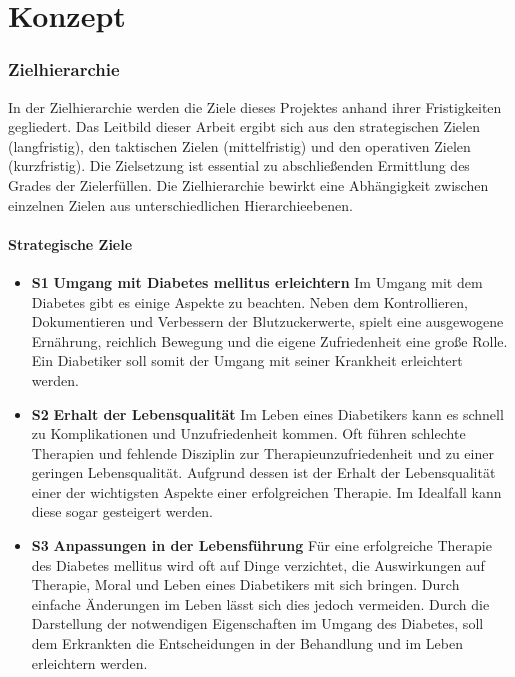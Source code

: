 \documentclass[a4paper,11pt]{article}%
\renewcommand{\\}{\vspace*{0.5\baselineskip} \newline}
\begin{document}
\newpage
\vspace*{\fill}
\part{Konzept}
\vfill
\newpage
\section{Zielhierarchie}
In der Zielhierarchie werden die Ziele dieses Projektes anhand ihrer Fristigkeiten gegliedert. Das Leitbild dieser Arbeit ergibt sich aus den strategischen Zielen (langfristig), den taktischen Zielen (mittelfristig) und den operativen Zielen (kurzfristig). Die Zielsetzung ist essential zu abschließenden Ermittlung des Grades der Zielerfüllen. Die Zielhierarchie bewirkt eine Abhängigkeit zwischen einzelnen Zielen aus unterschiedlichen Hierarchieebenen.
\subsection{Strategische Ziele}
\begin{itemize}
	\item \lbrack \textbf{S1}\rbrack  \textbf{ Umgang mit Diabetes mellitus erleichtern}\\
	Im Umgang mit dem Diabetes gibt es einige Aspekte zu beachten. Neben dem Kontrollieren, Dokumentieren und Verbessern der Blutzuckerwerte, spielt eine ausgewogene Ernährung, reichlich Bewegung und die eigene Zufriedenheit eine große Rolle. Ein Diabetiker soll somit der Umgang mit seiner Krankheit erleichtert werden.
	\item \lbrack \textbf{S2}\rbrack  \textbf{ Erhalt der Lebensqualität}\\
	Im Leben eines Diabetikers kann es schnell zu Komplikationen und Unzufriedenheit kommen. Oft führen schlechte Therapien und fehlende Disziplin zur Therapieunzufriedenheit und zu einer geringen Lebensqualität. Aufgrund dessen ist der Erhalt der Lebensqualität einer der wichtigsten Aspekte einer erfolgreichen Therapie. Im Idealfall kann diese sogar gesteigert werden.
	\item \lbrack \textbf{S3}\rbrack  \textbf{ Anpassungen in der Lebensführung} \\
	Für eine erfolgreiche Therapie des Diabetes mellitus wird oft auf Dinge verzichtet, die Auswirkungen auf Therapie, Moral und Leben eines Diabetikers mit sich bringen. Durch einfache Änderungen im Leben lässt sich dies jedoch vermeiden.  Durch die Darstellung der notwendigen Eigenschaften im Umgang des Diabetes, soll dem Erkrankten die Entscheidungen in der Behandlung und im Leben erleichtern werden.
\end{itemize}
\end{document}
